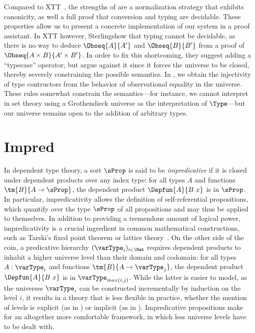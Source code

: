 Compared to XTT~, the strengths of \SetoidTT are a
normalization strategy that exhibits canonicity, as well a full proof that conversion and typing
are decidable. These properties allow us to present a concrete implementation of our system
in a proof assistant.
%
In XTT however, Sterling\etal show that typing cannot be decidable, as there is no way to deduce
\( \Obseq{A}{A'} \) and \( \Obseq{B}{B'} \) from a proof of \( \Obseq{A \times B}{A' \times B'} \).
%
In order to fix this shortcoming, they suggest adding a ``typecase'' operator, but
argue against it since it forces the universe to be closed, thereby severely constraining the
possible semantics.
%
In \SetoidTT, we obtain the injectivity of type contructors from the behavior of observational
equality in the universe. These rules somewhat constrain the semantics---for instance, we cannot
interpret \SetoidTT in set theory using a Grothendieck universe as the interpretation of \( \Type \)---but our universe remains open to the addition of arbitrary types.

\section{Impred}



In dependent type theory, a sort \( \sProp \) is said to be
\emph{impredicative} if it is closed under dependent products over any index
type: for all types \( A \) and functions \( \tm{B}{A \to \sProp} \),
the dependent product \( \Depfun{A}{B\ x} \) is in \( \sProp \).
%
In particular, impredicativity allows the definition of self-referential propositions,
which quantify over the type \( \sProp \) of all propositions and may thus
be applied to themselves.
%
In addition to providing a tremendous amount of logical power, impredicativity is
a crucial ingredient in common mathematical constructions, such as
Tarski's fixed point theorem or lattice theory~.
%
On the other side of the coin, a predicative hierarchy $(\varType_i)_{i \in \Nat}$
requires dependent products to inhabit a higher universe level
than their domain and codomain: for all types \( A : \varType_i \) and functions
\( \tm{B}{A \to \varType_j} \), the dependent product
\( \Depfun{A}{B\ x} \) is in \( \varType_{max(i,j)} \).
%
While the latter is easier to model, as the universes $\varType_i$ can be
constructed incrementally by induction on the level $i$, it results
in a theory that is less flexible in practice, whether the mention of
levels is explicit (as in \Agda) or implicit (as in \Coq).
%
Impredicative propositions make for an altogether
more comfortable framework, in which less universe levels have to
be dealt with.

